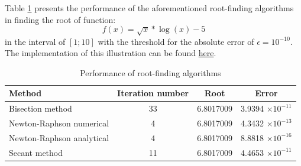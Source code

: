 Table \ref{tab:root_finding} presents the performance of the aforementioned root-finding algorithms in finding the root of function:
\begin{equation}
	f(x) = \sqrt{x} * \log(x) - 5
	\nonumber
\end{equation}
in the interval of $[1;10]$ with the threshold for the absolute error of $\epsilon = 10^{-10}$. The implementation of this illustration can be found \href{https://github.com/chitn/quantfin_study/blob/master/root_finding.py}{here}.
\begin{table}[H]
\begin{center}
\caption{Performance of root-finding algorithms}
\label{tab:root_finding}
\begin{tabular}{lccc}
Method                    & Iteration number & Root      & Error                    \\
\hline
Bisection method          & 33               & 6.8017009 & 3.9394 $\times 10^{-11}$ \\
Newton-Raphson numerical  & 4                & 6.8017009 & 4.3432 $\times 10^{-13}$ \\
Newton-Raphson analytical & 4                & 6.8017009 & 8.8818 $\times 10^{-16}$ \\
Secant method             & 11               & 6.8017009 & 4.4653 $\times 10^{-11}$
\end{tabular}
\end{center}
\end{table}

















